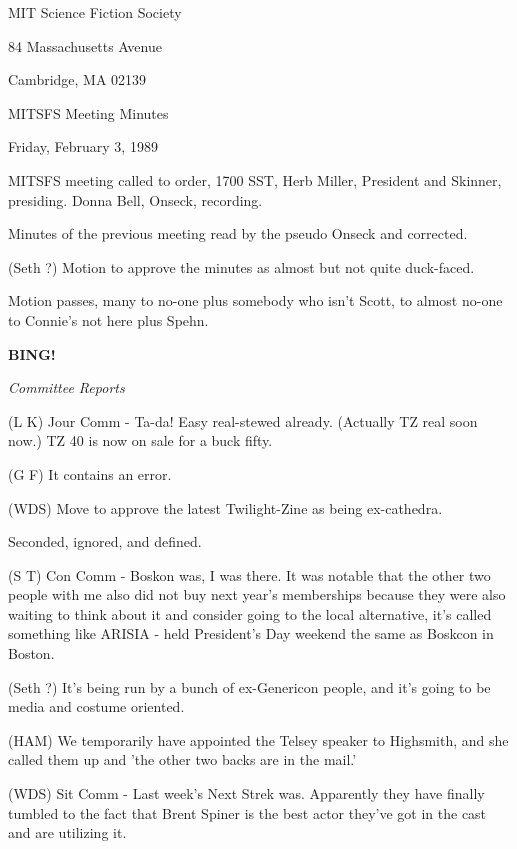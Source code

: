 \documentclass[12pt]{article}
\newcommand{\bing}{{\bf BING!} }
\newcommand{\goto}[1]{\bing \vskip 12pt \centerline{{\em{#1}}}}
\begin{document}
\begin{center}

MIT Science Fiction Society 

84 Massachusetts Avenue

Cambridge, MA 02139

\vspace{12pt}

MITSFS Meeting Minutes 

Friday, February 3, 1989

\end{center}
 
\vspace{18pt}

\setlength{\parskip}{6pt}

\noindent
MITSFS meeting called to order, 1700 SST, Herb Miller, President and Skinner, presiding. Donna Bell, Onseck, recording.

Minutes of the previous meeting read by the pseudo Onseck and corrected.  

(Seth ?) Motion to approve the minutes as almost but not quite duck-faced.   

Motion passes, many to no-one plus somebody who isn't Scott, to almost no-one to Connie's not here plus Spehn.

\goto{Committee Reports}

(L K) Jour Comm - Ta-da! Easy real-stewed already. (Actually TZ real soon now.) TZ 40 is now on sale for a buck fifty.

(G F) It contains an error.

(WDS) Move to approve the latest Twilight-Zine as being ex-cathedra.

Seconded, ignored, and defined.

(S T) Con Comm - Boskon was, I was there. It was notable that the other two people with me also did not buy next year's memberships because they were also waiting to think about it and consider going to the local alternative, it's called something like ARISIA - held President's Day weekend the same as Boskcon in Boston.

(Seth ?) It's being run by a bunch of ex-Genericon people, and it's going to be media and costume oriented.

(HAM) We temporarily have appointed the Telsey speaker to Highsmith, and she called them up and 'the other two backs are in the mail.'

(WDS) Sit Comm - Last week's Next Strek was. Apparently they have finally tumbled to the fact that Brent Spiner is the best actor they've got in the cast and are utilizing it.
\end{document}
